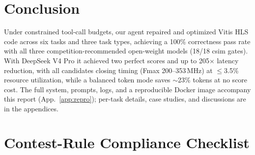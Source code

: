 \documentclass[10pt,conference,letterpaper]{IEEEtran}
\begin{document}
\section{Conclusion}

Under constrained tool-call budgets, our agent repaired and optimized Vitis HLS code across six tasks and three task types, achieving a 100\% correctness pass rate with all three competition-recommended open-weight models (18/18 csim gates). With DeepSeek V4 Pro it achieved two perfect scores and up to 205$\times$ latency reduction, with all candidates closing timing (Fmax 200--353\,MHz) at $\leq$3.5\% resource utilization, while a balanced token mode saves $\sim$23\% tokens at no score cost. The full system, prompts, logs, and a reproducible Docker image accompany this report (App.~\ref{app:repro}); per-task details, case studies, and discussions are in the appendices.




\appendix

\section{Contest-Rule Compliance Checklist}
\label{app:compliance}
\end{document}
